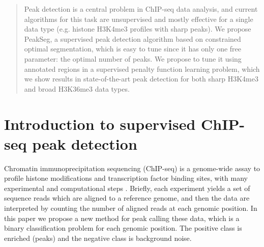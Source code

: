 \documentclass{article}
\begin{document}

\begin{abstract}
  Peak detection is a central problem in ChIP-seq data analysis, and
  current algorithms for this task are unsupervised and mostly
  effective for a single data type (e.g. histone H3K4me3 profiles with
  sharp peaks). We propose PeakSeg, a supervised peak detection
  algorithm based on constrained optimal segmentation, which is easy
  to tune since it has only one free parameter: the optimal number of
  peaks. We propose to tune it using annotated regions in a supervised
  penalty function learning problem, which we show results in
  state-of-the-art peak detection for both sharp H3K4me3 and broad
  H3K36me3 data types. 
\end{abstract}

\section{Introduction to supervised ChIP-seq peak detection}

Chromatin immunoprecipitation sequencing (ChIP-seq) is a genome-wide
assay to profile histone modifications and transcription factor
binding sites, with many experimental and computational steps
\citep{practical}. Briefly, each experiment yields a set of sequence
reads which are aligned to a reference genome, and then the data are
interpreted by counting the number of aligned reads at each genomic
position. In this paper we propose a new method for peak calling these
data, which is a binary classification problem for each genomic
position. The positive class is enriched (peaks) and the negative
class is background noise.
\end{document}
